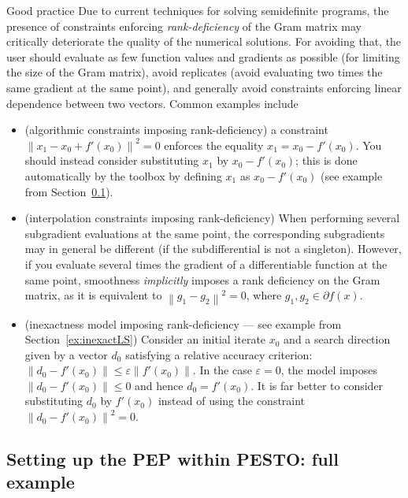 \documentclass[11pt,a4paper]{article}
\newcommand{\norm}[1]{{\left\lVert#1\right\rVert}}
\begin{document}
\begin{bclogo}[logo=\bcattention, couleur=blue!30, arrondi =0.1, sousTitre=rank deflection constraints]{Good practice}
Due to current techniques for solving semidefinite programs, the presence of constraints enforcing \emph{rank-deficiency} of the Gram matrix may critically deteriorate the quality of the numerical solutions. For avoiding that, the user should evaluate as few function values and gradients as possible (for limiting the size of the Gram matrix), avoid replicates (avoid evaluating two times the same gradient at the same point), and generally avoid constraints enforcing linear dependence between two vectors. Common examples include
\begin{itemize}
\item (algorithmic constraints imposing rank-deficiency) a constraint $\norm{x_1-x_0+f'(x_0)}^2=0$ enforces the equality $x_1=x_0-f'(x_0)$. You should instead consider substituting $x_1$ by $x_0-f'(x_0)$; this is done automatically by the toolbox by defining $x_1$ as $x_0-f'(x_0)$ (see example from Section~\ref{ex:gm_steps}).
\item (interpolation constraints imposing rank-deficiency) When performing several subgradient evaluations at the same point, the corresponding subgradients may in general be different (if the subdifferential is not a singleton). However, if you evaluate several times the gradient of a differentiable function at the same point, smoothness \emph{implicitly} imposes a rank deficiency on the Gram matrix, as it is equivalent to $\norm{g_1-g_2}^2=0$, where $g_1,g_2\in\partial f(x)$.
\item (inexactness model imposing rank-deficiency --- see example from Section~\ref{ex:inexactLS}) Consider an initial iterate $x_0$ and a search direction given by a vector $d_0$ satisfying a relative accuracy criterion: $\norm{d_0-f'(x_0)}\leq \varepsilon\norm{f'(x_0)}$. In the case $\varepsilon=0$, the model imposes 
$\norm{d_0-f'(x_0)}\leq 0$ and hence $d_0=f'(x_0)$. It is far better to consider substituting $d_0$ by $f'(x_0)$ instead of using the constraint $\norm{d_0-f'(x_0)}^2=0$.
\end{itemize}
\end{bclogo}
\newpage
\subsection{Setting up the PEP within PESTO: full example}\label{ex:gm_steps}
\end{document}
